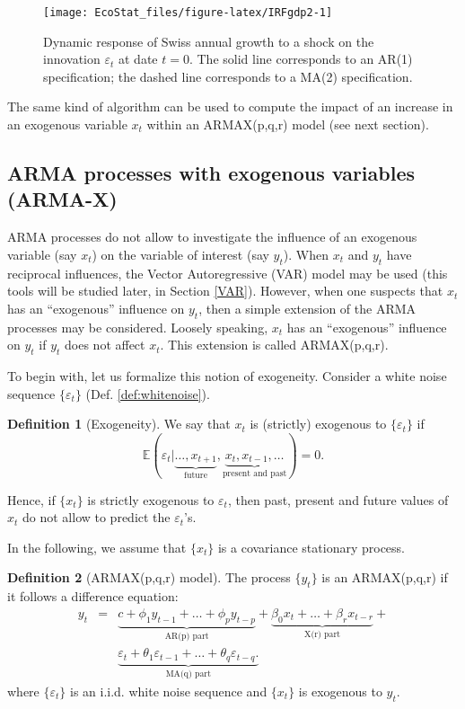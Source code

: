 \documentclass[
  12pt,
]{book}
\theoremstyle{definition}
\newtheorem{definition}{Definition}[chapter]
\theoremstyle{definition}
\theoremstyle{definition}
\theoremstyle{definition}
\theoremstyle{remark}
\begin{document}
\begin{figure}
\texttt{[image: EcoStat\_files/figure-latex/IRFgdp2-1]} \caption{Dynamic response of Swiss annual growth to a shock on the innovation $\varepsilon_t$ at date $t=0$. The solid line corresponds to an AR(1) specification; the dashed line corresponds to a MA(2) specification.}\label{fig:IRFgdp2}
\end{figure}

The same kind of algorithm can be used to compute the impact of an increase in an exogenous variable \(x_t\) within an ARMAX(p,q,r) model (see next section).

\hypertarget{ARMAIRF}{%
\subsection{ARMA processes with exogenous variables (ARMA-X)}\label{ARMAIRF}}

ARMA processes do not allow to investigate the influence of an exogenous variable (say \(x_t\)) on the variable of interest (say \(y_t\)). When \(x_t\) and \(y_t\) have reciprocal influences, the Vector Autoregressive (VAR) model may be used (this tools will be studied later, in Section \ref{VAR}). However, when one suspects that \(x_t\) has an ``exogenous'' influence on \(y_t\), then a simple extension of the ARMA processes may be considered. Loosely speaking, \(x_t\) has an ``exogenous'' influence on \(y_t\) if \(y_t\) does not affect \(x_t\). This extension is called ARMAX(p,q,r).

To begin with, let us formalize this notion of exogeneity. Consider a white noise sequence \(\{\varepsilon_t\}\) (Def. \ref{def:whitenoise}).

\begin{definition}[Exogeneity]
\protect\hypertarget{def:exogeneity}{}\label{def:exogeneity}We say that \(x_t\) is (strictly) exogenous to \(\{\varepsilon_t\}\) if
\[
\mathbb{E}(\varepsilon_t|\underbrace{\dots,x_{t+1}}_{\mbox{future}},\underbrace{x_t,x_{t-1},\dots}_{\mbox{present and past}}) = 0.
\]
\end{definition}

Hence, if \(\{x_t\}\) is strictly exogenous to \(\varepsilon_t\), then past, present and future values of \(x_t\) do not allow to predict the \(\varepsilon_t\)'s.

In the following, we assume that \(\{x_t\}\) is a covariance stationary process.

\begin{definition}[ARMAX(p,q,r) model]
\protect\hypertarget{def:ARMAX}{}\label{def:ARMAX}The process \(\{y_t\}\) is an ARMAX(p,q,r) if it follows a difference equation:
\begin{eqnarray}
y_t &=& \underbrace{c + \phi_1 y_{t-1} + \dots + \phi_p y_{t-p}}_{\mbox{AR(p) part}} + \underbrace{\beta_0 x_t + \dots + \beta_{r} x_{t-r}}_{\mbox{X(r) part}} + \nonumber \\
&&\underbrace{\varepsilon_t + \theta_1\varepsilon_{t-1}+\dots +\theta_{q}\varepsilon_{t-q}.}_{\mbox{MA(q) part}} \label{eq:DLM}
\end{eqnarray}
where \(\{\varepsilon_t\}\) is an i.i.d. white noise sequence and \(\{x_t\}\) is exogenous to \(y_t\).
\end{definition}
\end{document}

